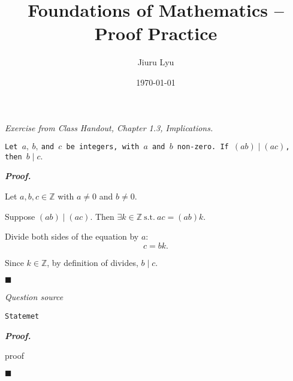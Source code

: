 \documentclass[11pt,letter]{article}
\title{Foundations of Mathematics -- \textbf{Proof Practice}}
\author{Jiuru Lyu}
\date{\today}
\newenvironment*{p}{\par\noindent\textbf{\textit{Proof. }}\par}{\par\hfill $\blacksquare$\par}
\newenvironment*{q}[1]{\centering\emph{#1}\par\noindent\texttt}{}
\def\Z{{\mathbb{Z}}}
\def\st{\ \mathrm{s.t.}\ }
\begin{document}
\maketitle
{}

\begin{framed}
\begin{q}{Exercise from Class Handout, Chapter 1.3, Implications.}{Let $a,\ b,\ $and $c$ be integers, with $a$ and $b$ non-zero. If $(ab)\mid(ac)$, then $b\mid c.$}\end{q}
\end{framed}
\begin{p}
	Let	$a,b,c\in\Z$ with $a\neq0$ and $b\neq0$.\par Suppose $(ab)\mid(ac)$. Then $\exists k\in\Z\st ac=(ab)k$.\par Divide both sides of the equation by $a$: \[c=bk.\] \par Since $k\in\Z$, by definition of divides, $b\mid c$.
\end{p}
\begin{framed}

\begin{q}
{Question source}
{Statemet}	
\end{q}	
\end{framed}
\begin{p}
	proof
\end{p}





\label{LastPage}
\end{document}
